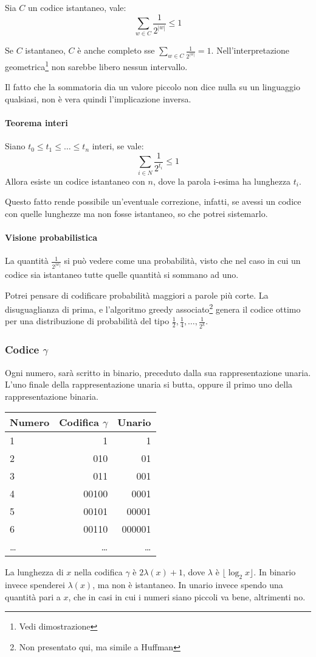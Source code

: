 \begin{definition}
    Sia $C$ un codice istantaneo, vale: 
    $$\sum_{w \in C} \frac{1}{2^{|w|}} \leq 1$$
\end{definition}
Se $C$ istantaneo, $C$ è anche completo sse $\sum_{w \in C} \frac{1}{2^{|w|}} = 1$.
Nell'interpretazione geometrica\footnote{Vedi dimostrazione} non sarebbe
libero nessun intervallo. 

\begin{remark}
    Il fatto che la sommatoria dia un valore piccolo non dice nulla su un linguaggio 
    qualsiasi, non è vera quindi l'implicazione inversa.
\end{remark}

\paragraph{Teorema interi}
Siano $t_0 \leq t_1 \leq \dots \leq t_n$ interi, se vale:
$$\sum_{i \in N} \frac{1}{2^{t_i}} \leq 1$$
Allora esiste un codice istantaneo con $n$, dove la parola i-esima ha lunghezza $t_i$.

Questo fatto rende possibile un'eventuale correzione, infatti, se avessi un codice con quelle lunghezze 
ma non fosse istantaneo, so che potrei sistemarlo.

\paragraph{Visione probabilistica}
La quantità $\frac{1}{2^{|w|}}$ si può vedere come una probabilità, visto che nel caso 
in cui un codice sia istantaneo tutte quelle quantità si sommano ad uno.

Potrei pensare di codificare probabilità maggiori a parole più corte. 
La disuguaglianza di prima, e l'algoritmo greedy associato\footnote{Non presentato qui, ma simile a Huffman}
genera il codice ottimo per una distribuzione di probabilità del tipo $\frac{1}{2}, \frac{1}{4}, \dots, \frac{1}{2^k}$.

\subsubsection{Codice $\gamma$}

Ogni numero, sarà scritto in binario, preceduto dalla sua rappresentazione unaria.
L'uno finale della rappresentazione unaria si butta, oppure il primo uno della 
rappresentazione binaria.
\begin{center}
    \begin{tabular}{|l | r | r |}
        \hline
        Numero & Codifica $\gamma$ & Unario\\
        \hline
        1 & 1 & 1\\
        2 & 010 & 01\\
        3 & 011 & 001\\ 
        4 & 00100 & 0001\\ 
        5 & 00101 & 00001\\ 
        6 & 00110 & 000001\\ 
        \dots & \dots & \dots\\
        \hline
    \end{tabular}
\end{center}

La lunghezza di $x$ nella codifica $\gamma$ è $2\lambda(x) + 1$, dove $\lambda$ è
$\lfloor \log_2 x\rfloor$.
In binario invece spenderei $\lambda(x)$, ma non è istantaneo. In unario invece 
spendo una quantità pari a $x$, che in casi in cui i numeri siano piccoli va bene, altrimenti no.